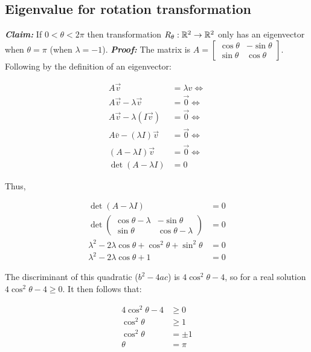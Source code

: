 \subsection{Eigenvalue for rotation transformation}

\textbf{\textit{Claim:}} 
If $0< \theta <2\pi$ then transformation $R_\theta : \mathbb{R}^2\rightarrow \mathbb{R}^2$ only has an eigenvector when $\theta=\pi$ (when $\lambda=-1$).
\newline \noindent
\textbf{\textit{Proof:}}
\noindent
The matrix is $A=\begin{bmatrix}\cos\theta & -\sin\theta\\\sin\theta & \cos\theta\end{bmatrix}$. Following by the definition of an eigenvector:

\[
    \begin{aligned}
        A \vec{v} &=\lambda v \Longleftrightarrow \\
        A \vec{v}-\lambda \vec{v} &=\overrightarrow{0} \Longleftrightarrow \\
        A \vec{v}-\lambda(I \vec{v}) &=\overrightarrow{0} \Longleftrightarrow \\
        A \bar{v}-(\lambda I) \vec{v} &=\overrightarrow{0} \Longleftrightarrow \\
        (A-\lambda I) \vec{v} &=\overrightarrow{0} \Longleftrightarrow \\
            \operatorname{det}(A-\lambda I)&=0
        \end{aligned}    
\]

Thus,

\[
    \begin{aligned}
        \operatorname{det}(A-\lambda I) &=0 \\
        \operatorname{det}\left(\begin{array}{cc}
        \cos \theta-\lambda & -\sin \theta \\
        \sin \theta & \cos \theta-\lambda
        \end{array}\right) &=0 \\
        \lambda^{2}-2 \lambda \cos \theta+\cos ^{2} \theta+\sin ^{2} \theta &=0 \\
        \lambda^{2}-2 \lambda \cos \theta+1 &=0
        \end{aligned}    
\]

The discriminant of this quadratic ($b^2-4ac$) is $4\cos^2\theta-4$, so for a real solution $4\cos^2\theta-4\geq 0$. It then follows
that:

\begin{align*}
    4\cos^2\theta-4&\geq 0\\
    \cos^2\theta&\geq 1\\
    \cos^2\theta&=\pm 1\\
    \theta&=\pi
\end{align*}


